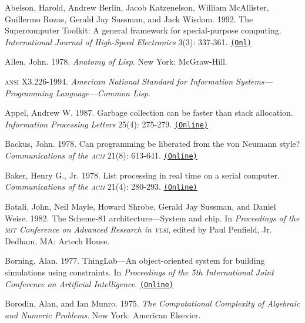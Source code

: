 \documentclass[oneside]{book}
\newcommand{\acronym}[1]{\textsc{\MakeLowercase{#1}}}
\newcommand{\code}[1]{\texttt{#1}}
\begin{document}
 \label{Abelson et al. 1992}
Abelson, Harold, Andrew Berlin, Jacob Katzenelson, William McAllister,
Guillermo Rozas, Gerald Jay Sussman, and Jack Wisdom. 1992.  The Supercomputer
Toolkit: A general framework for special-purpose computing.
\textit{International Journal of High-Speed Electronics} 3(3): 337-361.
\href{http://www.hpl.hp.com/techreports/94/HPL-94-30.html}{\code{(Onl)}}

 \label{Allen 1978}
Allen, John.  1978.  \textit{Anatomy of Lisp}. New York: McGraw-Hill.

 \label{ANSI 1994}
\acronym{ANSI} X3.226-1994. \textit{American National Standard for Information
Sys\-tems---Programming Language---Common Lisp}.

 \label{Appel 1987}
Appel, Andrew W.  1987.  Garbage collection can be faster than stack
allocation.  \textit{Information Processing Letters} 25(4): 275-279.
\href{http://citeseer.ist.psu.edu/viewdoc/summary?doi=10.1.1.39.8219}{\code{(Online)}}

 \label{Backus 1978}
Backus, John.  1978.  Can programming be liberated from the von Neumann style?
\textit{Communications of the \acronym{ACM}} 21(8): 613-641.
\href{http://www.stanford.edu/class/cs242/readings/backus.pdf}{\code{(Online)}}

 \label{Baker (1978)}
Baker, Henry G., Jr.  1978.  List processing in real time on a serial computer.
\textit{Communications of the \acronym{ACM}} 21(4): 280-293.
\href{http://dspace.mit.edu/handle/1721.1/41976}{\code{(Online)}}

 \label{Batali et al. 1982}
Batali, John, Neil Mayle, Howard Shrobe, Gerald Jay Sussman, and Daniel Weise.
1982.  The Scheme-81 architecture---System and chip.  In \textit{Proceedings of
the \acronym{MIT} Conference on Advanced Research in \acronym{VLSI}}, edited by
Paul Penfield, Jr. Dedham, MA: Artech House.

 \label{Borning (1977)}
Borning, Alan.  1977.  ThingLab---An object-oriented system for building
simulations using constraints. In \textit{Proceedings of the 5th International
Joint Conference on Artificial Intelligence}.
\href{http://ijcai.org/Past\%20Proceedings/IJCAI-77-VOL1/PDF/085.pdf}{\code{(Online)}}

 \label{Borodin and Munro (1975)}
Borodin, Alan, and Ian Munro.  1975.  \textit{The Computational Complexity of
Algebraic and Numeric Problems}. New York: American Elsevier.
\end{document}
